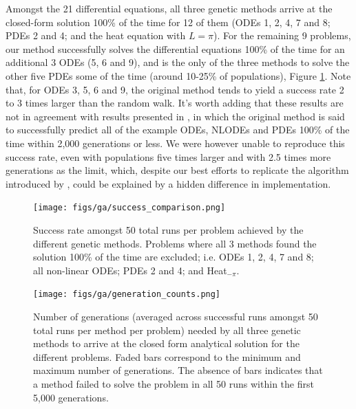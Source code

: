 \documentclass[aps,reprint,superscriptaddress,nofootinbib]{revtex4-2}
\begin{document}
    Amongst the 21 differential equations, all three genetic methods arrive at the closed-form solution 100\% of the time for 12 of them (ODEs 1, 2, 4, 7 and 8; PDEs 2 and 4; and the heat equation with \(L = \pi\)). For the remaining 9 problems, our method successfully solves the differential equations 100\% of the time for an additional 3 ODEs (5, 6 and 9), and is the only of the three methods to solve the other five PDEs some of the time (around 10-25\% of populations), Figure \ref{fig:success_comparison}. Note that, for ODEs 3, 5, 6 and 9, the original method tends to yield a success rate 2 to 3 times larger than the random walk. It's worth adding that these results are not in agreement with results presented in \cite{solving_diff_reproduce}, in which the original method is said to successfully predict all of the example ODEs, NLODEs and PDEs 100\% of the time within 2,000 generations or less. We were however unable to reproduce this success rate, even with populations five times larger and with 2.5 times more generations as the limit, which, despite our best efforts to replicate the algorithm introduced by \cite{solving_diff_reproduce}, could be explained by a hidden difference in implementation.
    
    \begin{figure}[htp]
        \centering
        \texttt{[image: figs/ga/success\_comparison.png]}
        \caption{Success rate amongst 50 total runs per problem achieved by the different genetic methods. Problems where all 3 methods found the solution 100\% of the time are excluded; i.e. ODEs 1, 2, 4, 7 and 8; all non-linear ODEs; PDEs 2 and 4; and Heat\(_{-\pi}\).}
        \label{fig:success_comparison}
    \end{figure}
    
    \begin{figure}[t]
        \centering
        \texttt{[image: figs/ga/generation\_counts.png]}
        \caption{Number of generations (averaged across successful runs amongst 50 total runs per method per problem) needed by all three genetic methods to arrive at the closed form analytical solution for the different problems. Faded bars correspond to the minimum and maximum number of generations. The absence of bars indicates that a method failed to solve the problem in all 50 runs within the first 5,000 generations.}
        \label{fig:generation_counts}
    \end{figure}
    
\end{document}
